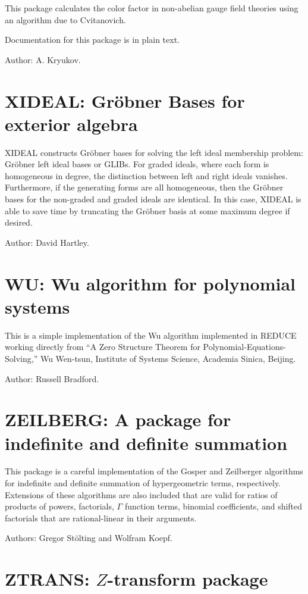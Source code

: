 This package calculates the color factor in non-abelian gauge field
theories using an algorithm due to Cvitanovich.

Documentation for this package is in plain text.

Author: A. Kryukov.

\section{XIDEAL: Gr\"obner Bases for exterior algebra} 

XIDEAL constructs Gr\"obner bases for solving the left ideal membership
problem: Gr\"obner left ideal bases or GLIBs. For graded ideals, where each
form is homogeneous in degree, the distinction between left and right
ideals vanishes. Furthermore, if the generating forms are all homogeneous,
then the Gr\"obner bases for the non-graded and graded ideals are
identical. In this case, XIDEAL is able to save time by truncating the
Gr\"obner basis at some maximum degree if desired.

Author: David Hartley.

\section{WU: Wu algorithm for polynomial systems} 

This is a simple implementation of the Wu algorithm implemented in REDUCE
working directly from ``A Zero Structure Theorem for
Polynomial-Equations-Solving,'' Wu Wen-tsun, Institute of Systems Science,
Academia Sinica, Beijing.

Author: Russell Bradford.

\section{ZEILBERG: A package for indefinite and definite summation}

This package is a careful implementation of the Gosper and Zeilberger
algorithms for indefinite and definite summation of hypergeometric terms,
respectively.  Extensions of these algorithms are also included that are
valid for ratios of products of powers, factorials, $\Gamma$ function
terms, binomial coefficients, and shifted factorials that are
rational-linear in their arguments.

Authors: Gregor St\"olting and Wolfram Koepf.

\section{ZTRANS: $Z$-transform package} 

